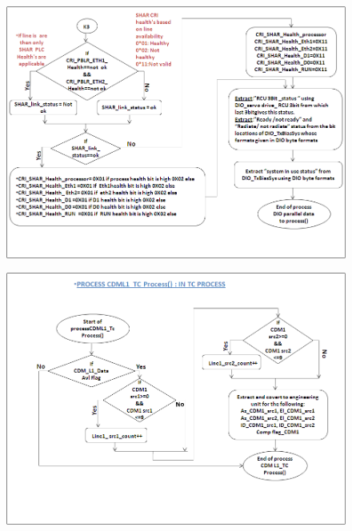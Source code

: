 \begin{figure}[H]
	\centering
	\includegraphics[width=\linewidth]{./FlowCharts/PngFlowCharts/TCP7.png}
\end{figure}

\begin{figure}[H]
	\centering
	\includegraphics[width=\linewidth]{./FlowCharts/PngFlowCharts/TCP8.png}
\end{figure}

